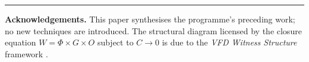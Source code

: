 \documentclass[11pt,a4paper]{article}
\newcommand{\Wit}{W}
\begin{document}
\bigskip

\hrule
\bigskip

\noindent
\textbf{Acknowledgements.} This paper synthesises the programme's
preceding work; no new techniques are introduced. The structural
diagram licensed by the closure equation $\Wit = \Phi \times G
\times O$ subject to $C \to 0$ is due to the
\textit{VFD Witness Structure} framework
\cite{observerAttractor}.



\end{document}
